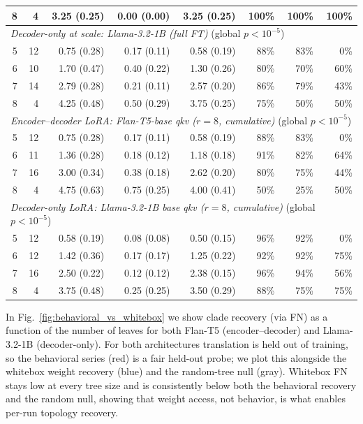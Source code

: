 \documentclass{article}
\theoremstyle{definition}
\theoremstyle{plain}
\begin{document}
\begin{table}[t]
\begin{center}
\begin{tabular}{rrrrrrrr}
8 &  4 & 3.25 (0.25) & 0.00 (0.00) & 3.25 (0.25) & 100\% & 100\% & 100\% \\
\midrule
\multicolumn{8}{l}{\textit{Decoder-only at scale: Llama-3.2-1B (full FT)} \quad(global $p<10^{-5}$)} \\
5 & 12 & 0.75 (0.28) & 0.17 (0.11) & 0.58 (0.19) & 88\% & 83\% &   0\% \\
6 & 10 & 1.70 (0.47) & 0.40 (0.22) & 1.30 (0.26) & 80\% & 70\% &  60\% \\
7 & 14 & 2.79 (0.28) & 0.21 (0.11) & 2.57 (0.20) & 86\% & 79\% &  43\% \\
8 &  4 & 4.25 (0.48) & 0.50 (0.29) & 3.75 (0.25) & 75\% & 50\% &  50\% \\
\midrule
\multicolumn{8}{l}{\textit{Encoder--decoder LoRA: Flan-T5-base qkv ($r{=}8$, cumulative)} \quad(global $p<10^{-5}$)} \\
5 & 12 & 0.75 (0.28) & 0.17 (0.11) & 0.58 (0.19) & 88\% & 83\% &   0\% \\
6 & 11 & 1.36 (0.28) & 0.18 (0.12) & 1.18 (0.18) & 91\% & 82\% &  64\% \\
7 & 16 & 3.00 (0.34) & 0.38 (0.18) & 2.62 (0.20) & 80\% & 75\% &  44\% \\
8 &  4 & 4.75 (0.63) & 0.75 (0.25) & 4.00 (0.41) & 50\% & 25\% &  50\% \\
\midrule
\multicolumn{8}{l}{\textit{Decoder-only LoRA: Llama-3.2-1B base qkv ($r{=}8$, cumulative)} \quad(global $p<10^{-5}$)} \\
5 & 12 & 0.58 (0.19) & 0.08 (0.08) & 0.50 (0.15) & 96\% & 92\% &   0\% \\
6 & 12 & 1.42 (0.36) & 0.17 (0.17) & 1.25 (0.22) & 92\% & 92\% &  75\% \\
7 & 16 & 2.50 (0.22) & 0.12 (0.12) & 2.38 (0.15) & 96\% & 94\% &  56\% \\
8 &  4 & 3.75 (0.48) & 0.25 (0.25) & 3.50 (0.29) & 88\% & 75\% &  75\% \\
\bottomrule
\end{tabular}
\end{center}
\end{table}

In Fig.~\ref{fig:behavioral_vs_whitebox} we show clade recovery (via FN) as a function of the number
of leaves for both Flan-T5 (encoder--decoder) and Llama-3.2-1B (decoder-only). For both architectures
translation is held out of training, so the behavioral series (red) is a fair held-out probe; we plot
this alongside the whitebox weight recovery (blue) and the random-tree null (gray). Whitebox FN stays
low at every tree size and is consistently below both the behavioral recovery and the random null,
showing that weight access, not behavior, is what enables per-run topology recovery.
\end{document}
